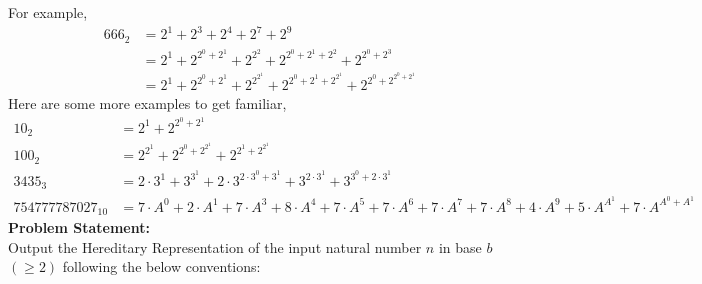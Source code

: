 For example, 
\begin{equation}
\begin{aligned}
666_2 &= 2^1 + 2^3 + 2^4 + 2^7 + 2^9\\
&= 2^1  + 2^{2^0+2^1} + 2^{2^2} + 2^{2^{0}+2^1+2^2} + 2^{2^{0}+2^3}\\
&= 2^{1} + 2^{2^{0} + 2^{1}} + 2^{2^{2^{1}}} + 2^{2^{0} + 2^{1} + 2^{2^{1}}} + 2^{2^{0} + 2^{2^{0} + 2^{1}}}
\end{aligned}
\end{equation}
Here are some more examples to get familiar,
\begin{align*}
10_2 &= 2^{1} + 2^{2^{0} + 2^{1}}\\
100_2 &= 2^{2^{1}} + 2^{2^{0} + 2^{2^{1}}} + 2^{2^{1} + 2^{2^{1}}}\\
3435_3 &= 2\cdot3^{1} + 3^{3^{1}} + 2\cdot3^{2\cdot3^{0} + 3^{1}} + 3^{2\cdot3^{1}} + 3^{3^{0} + 2\cdot3^{1}}\\
754777787027_{10} &= 7\cdot A^{0} + 2\cdot A^{1} + 7\cdot A^{3} + 8\cdot A^{4} + 7\cdot A^{5} + 7\cdot A^{6} + 7\cdot A^{7} + 7\cdot A^{8} + 4\cdot A^{9} + 5\cdot A^{A^{1}} + 7\cdot A^{A^{0} + A^{1}}
\end{align*}
\textbf{Problem Statement:}\\
Output the Hereditary Representation of the input natural number $n$ in base $b$ $(\geq2)$ following the below conventions:

